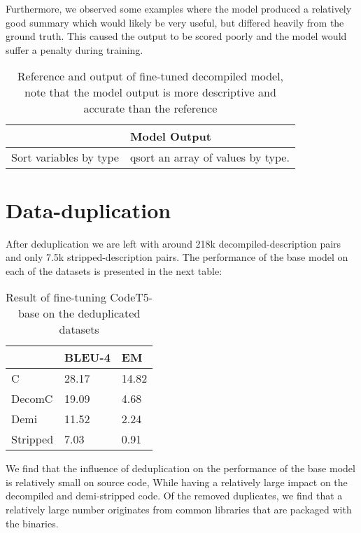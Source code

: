 Furthermore, we observed some examples where the model produced a relatively good summary which would likely be very useful, but differed heavily from the ground truth. This caused the output to be scored poorly and the model would suffer a penalty during training.
\label{tab:betterOutput}
\begin{table}[!h]
\centering
\begin{tabular}{ll}
\hline
\rowcolor[HTML]{9B9B9B} 
\multicolumn{1}{|l}{\cellcolor[HTML]{9B9B9B}Reference} & \multicolumn{1}{l|}{\cellcolor[HTML]{9B9B9B}Model Output} \\ \hline
Sort variables by type                                 & qsort an array of values by type.       
\end{tabular}
\caption{Reference and output of fine-tuned decompiled model, note that the model output is more descriptive and accurate than the reference}
\end{table}


\section{Data-duplication}
After deduplication we are left with around 218k decompiled-description pairs and only 7.5k stripped-description pairs. The performance of the base model on each of the datasets is presented in the next table:

\label{tab:deduplicated}
\begin{table}[!h]
\centering
\begin{tabular}{lll}
\hline
\rowcolor[HTML]{C0C0C0} 
\multicolumn{1}{|l}{\cellcolor[HTML]{C0C0C0}\textbf{Deduplicated}} & BLEU-4  & \multicolumn{1}{l|}{\cellcolor[HTML]{C0C0C0}EM} \\ \hline
C                                                                  & 28.17 & 14.82                                           \\
DecomC                                                             & 19.09 & 4.68                                            \\
Demi                                                           & 11.52   & 2.24                                             \\
Stripped                                                               & 7.03   & 0.91                                            
\end{tabular}
\caption{Result of fine-tuning CodeT5-base on the deduplicated datasets}
\end{table}
We find that the influence of deduplication on the performance of the base model is relatively small on source code, While having a relatively large impact on the decompiled and demi-stripped code. 
Of the removed duplicates, we find that a relatively large number originates from common libraries that are packaged with the binaries. 

